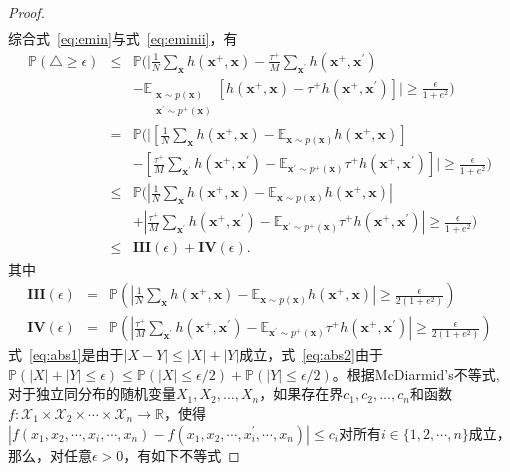 \begin{lemma}
\begin{proof}
\begin{eqnarray}
		\end{eqnarray}
综合式~\eqref{eq:emin}与式~\eqref{eq:eminii}，有
		\begin{eqnarray}
\mathbb{P}(\triangle \geq \epsilon)
			&\leq& \mathbb{P} ( |\frac{1}{N}  \sum_{\mathbf{x}} h(\mathbf{x}^+,\mathbf{x})  -\frac{\tau^+}{M} \sum_{\mathbf{x}^\prime} h(\mathbf{x}^+,\mathbf{x}^\prime)  \label{eq:abs}\\ &&-\mathbb{E}_{\substack{\mathbf x \sim p(\mathbf x) \\ \mathbf x^\prime \sim p^+(\mathbf x)}} [ h(\mathbf{x}^+,\mathbf{x}) - \tau^+h(\mathbf{x}^+,\mathbf{x}^\prime)]| \geq \frac{\epsilon}{1+e^2}  ) \nonumber\\
			&=& \mathbb{P} (|[\frac{1}{N}  \sum_{\mathbf{x}} h(\mathbf{x}^+,\mathbf{x}) -\mathbb{E}_{\mathbf x \sim p(\mathbf x)}  h(\mathbf{x}^+,\mathbf{x}) ] \\
			&&-[\frac{\tau^+}{M} \sum_{\mathbf{x}^\prime} h(\mathbf{x}^+,\mathbf{x}^\prime)  -\mathbb{E}_{\mathbf x^\prime \sim p^+(\mathbf x)}  \tau^+h(\mathbf{x}^+,\mathbf{x}^\prime)]| \geq \frac{\epsilon}{1+e^2}  ) \nonumber\\
			&\leq& \mathbb{P} (|\frac{1}{N}  \sum_{\mathbf{x}} h(\mathbf{x}^+,\mathbf{x}) -\mathbb{E}_{\mathbf x \sim p(\mathbf x)}  h(\mathbf{x}^+,\mathbf{x})| \label{eq:abs1}\\
			&&+|\frac{\tau^+}{M} \sum_{\mathbf{x}^\prime} h(\mathbf{x}^+,\mathbf{x}^\prime)  -\mathbb{E}_{\mathbf x^\prime \sim p^+(\mathbf x)}  \tau^+h(\mathbf{x}^+,\mathbf{x}^\prime)| \geq \frac{\epsilon}{1+e^2}  ) \nonumber\\
			&\leq& \mathbf{III} (\epsilon) + \mathbf{IV} (\epsilon). \label{eq:abs2}
		\end{eqnarray}
其中
		\begin{eqnarray}
			\mathbf{III} (\epsilon) &=& \mathbb{P}(|\frac{1}{N}  \sum_{\mathbf{x}} h(\mathbf{x}^+,\mathbf{x}) -\mathbb{E}_{\mathbf x \sim p(\mathbf x)}  h(\mathbf{x}^+,\mathbf{x})| \geq \frac{\epsilon}{2(1+e^2)}  ) \\
			\mathbf{IV} (\epsilon) &=&\mathbb{P}(|\frac{\tau^+}{M} \sum_{\mathbf{x}^\prime} h(\mathbf{x}^+,\mathbf{x}^\prime)  -\mathbb{E}_{\mathbf x^\prime \sim p^+(\mathbf x)}  \tau^+h(\mathbf{x}^+,\mathbf{x}^\prime)|\geq \frac{\epsilon}{2(1+e^2)}  ) 
		\end{eqnarray}
式~\eqref{eq:abs1}是由于$|X-Y| \leq |X|+|Y|$成立，式~\eqref{eq:abs2}由于
		$\mathbb{P}(|X|+|Y| \leq \epsilon) \leq \mathbb{P}(|X| \leq \epsilon/2) + \mathbb{P}(|Y| \leq \epsilon/2)$。根据McDiarmid's不等式, 对于独立同分布的随机变量$X_{1},X_{2},\dots ,X_{n}$，如果存在界${\displaystyle c_{1},c_{2},\dots ,c_{n}}$和函数${\displaystyle f:{\mathcal {X}}_{1}\times {\mathcal {X}}_{2}\times \cdots \times {\mathcal {X}}_{n}\rightarrow \mathbb {R} }$，使得$|f(x_1,x_2,\cdots,x_i,\cdots,x_n)-f(x_1,x_2,\cdots,x_i^\prime,\cdots,x_n)|\leq c_i$对所有$i\in \{1,2,\cdots,n\}$成立，那么，对任意$\epsilon >0$，有如下不等式

\end{proof}
\end{lemma}
